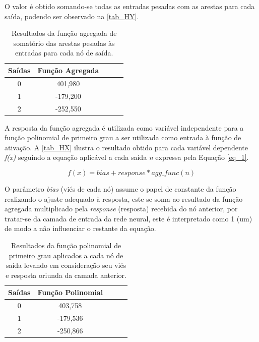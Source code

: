 O valor é obtido somando-se todas as entradas pesadas com as arestas para cada saída, podendo ser observado na \autoref{tab_HY}.

\begin{table}[htb]
	\centering
    \caption{\label{tab_HY}Resultados da função agregada de somatório das arestas pesadas às entradas para cada nó de saída.}
    \begin{tabular}{ccccc}
        \hline
		\textbf{Sa\'{i}das} & \textbf{Fun\c{c}\~{a}o Agregada} \\ \hline
		0 & 401,980    \\ \hline
		1 & -179,200    \\ \hline
		2 & -252,550  \\ \hline
    \end{tabular}
    
\end{table}

A resposta da função agregada é utilizada como variável independente para a função polinomial de primeiro grau a ser utilizada
como entrada à função de ativação. A \autoref{tab_HX} ilustra o resultado obtido para cada variável dependente \textit{f(x)}
seguindo a equação aplicável a cada saída \textit{n} expressa pela Equação \ref{eq_1}.

\begin{equation}
\label{eq_1}
f(x) = bias + response * agg\_func(n)
\end{equation}

O parâmetro \textit{bias} (viés de cada nó) assume o papel de constante da função realizando o ajuste adequado à resposta,
este se soma ao resultado da função agregada multiplicado pela \textit{response} (resposta) recebida do nó anterior,
por tratar-se da camada de entrada da rede neural, este é interpretado como 1 (um) de modo a não influenciar o restante da equação.

\begin{table}[htb]
	\centering
    \caption{\label{tab_HX}Resultados da função polinomial de primeiro grau aplicados a cada nó de saída levando em consideração seu viés e resposta oriunda da camada anterior.}
    \begin{tabular}{ccccc}
        \hline
		\textbf{Sa\'{i}das} & \textbf{Fun\c{c}\~{a}o Polinomial} \\ \hline
		0 & 403,758    \\ \hline
		1 & -179,536    \\ \hline
		2 & -250,866  \\ \hline
    \end{tabular}
    
\end{table}

